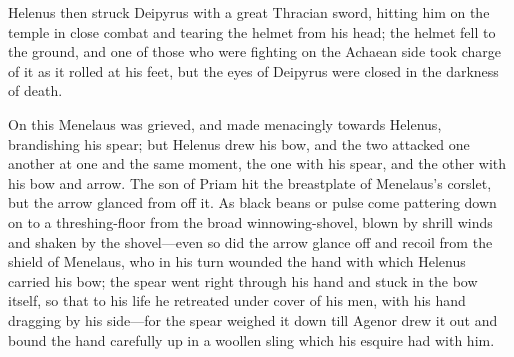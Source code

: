 Helenus then struck Deipyrus with a great Thracian sword, hitting him on
the temple in close combat and tearing the helmet from his head; the
helmet fell to the ground, and one of those who were fighting on the
Achaean side took charge of it as it rolled at his feet, but the eyes of
Deipyrus were closed in the darkness of death.

On this Menelaus was grieved, and made menacingly towards Helenus,
brandishing his spear; but Helenus drew his bow, and the two attacked one
another at one and the same moment, the one with his spear, and the other
with his bow and arrow. The son of Priam hit the breastplate of Menelaus’s
corslet, but the arrow glanced from off it. As black beans or pulse come
pattering down on to a threshing-floor from the broad winnowing-shovel,
blown by shrill winds and shaken by the shovel—even so did the arrow
glance off and recoil from the shield of Menelaus, who in his turn wounded
the hand with which Helenus carried his bow; the spear went right through
his hand and stuck in the bow itself, so that to his life he retreated
under cover of his men, with his hand dragging by his side—for the
spear weighed it down till Agenor drew it out and bound the hand carefully
up in a woollen sling which his esquire had with him.

